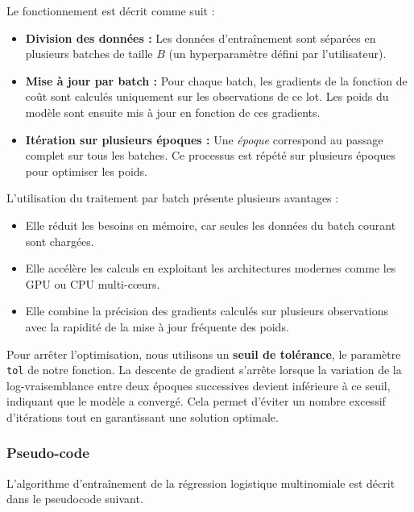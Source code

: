 \documentclass{rapport}
\begin{document}
Le fonctionnement est décrit comme suit :
\begin{itemize}
    \item \textbf{Division des données :} Les données d'entraînement sont séparées en plusieurs batches de taille $B$ (un hyperparamètre défini par l'utilisateur).
    \item \textbf{Mise à jour par batch :} Pour chaque batch, les gradients de la fonction de coût sont calculés uniquement sur les observations de ce lot. Les poids du modèle sont ensuite mis à jour en fonction de ces gradients.
    \item \textbf{Itération sur plusieurs époques :} Une \emph{époque} correspond au passage complet sur tous les batches. Ce processus est répété sur plusieurs époques pour optimiser les poids.
\end{itemize}

L'utilisation du traitement par batch présente plusieurs avantages :
\begin{itemize}
    \item Elle réduit les besoins en mémoire, car seules les données du batch courant sont chargées.
    \item Elle accélère les calculs en exploitant les architectures modernes comme les GPU ou CPU multi-cœurs.
    \item Elle combine la précision des gradients calculés sur plusieurs observations avec la rapidité de la mise à jour fréquente des poids.
\end{itemize}

Pour arrêter l'optimisation, nous utilisons un \textbf{seuil de tolérance}, le paramètre \texttt{tol} de notre fonction. La descente de gradient s'arrête lorsque la variation de la log-vraisemblance entre deux époques successives devient inférieure à ce seuil, indiquant que le modèle a convergé. Cela permet d'éviter un nombre excessif d'itérations tout en garantissant une solution optimale.


\subsubsection{Pseudo-code}


L'algorithme d'entraînement de la régression logistique multinomiale est décrit dans le pseudocode suivant.
\end{document}
